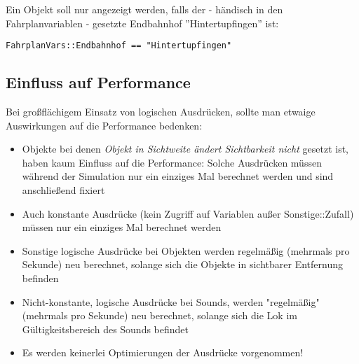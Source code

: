 Ein Objekt soll nur angezeigt werden, falls der - händisch in den Fahrplanvariablen - gesetzte Endbahnhof ''Hintertupfingen'' ist:

\begin{lstlisting}
FahrplanVars::Endbahnhof == "Hintertupfingen"
\end{lstlisting}

\subsection{Einfluss auf Performance}

Bei großflächigem Einsatz von logischen Ausdrücken, sollte man etwaige
Auswirkungen auf die Performance bedenken:

\begin{itemize}
\item
  Objekte bei denen \emph{Objekt in Sichtweite ändert Sichtbarkeit
  nicht} gesetzt ist, haben kaum Einfluss auf die Performance: Solche
  Ausdrücken müssen während der Simulation nur ein einziges Mal
  berechnet werden und sind anschließend fixiert
\item
  Auch konstante Ausdrücke (kein Zugriff auf Variablen außer
  Sonstige::Zufall) müssen nur ein einziges Mal berechnet werden
\item
  Sonstige logische Ausdrücke bei Objekten werden regelmäßig (mehrmals
  pro Sekunde) neu berechnet, solange sich die Objekte in sichtbarer
  Entfernung befinden
\item
  Nicht-konstante, logische Ausdrücke bei Sounds, werden "regelmäßig"
  (mehrmals pro Sekunde) neu berechnet, solange sich die Lok im
  Gültigkeitsbereich des Sounds befindet
\item
  Es werden keinerlei Optimierungen der Ausdrücke vorgenommen!
\end{itemize}